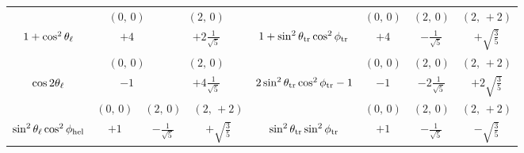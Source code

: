 \begin{table}[p]
\begin{tabular}{| c | c c c c c c || c | c c c c c c |}
                                     &  \multicolumn{3}{c|}{$(0,\,0)$}
                                     &  \multicolumn{3}{c||}{$(2,\,0)$}               &
                                     &  \multicolumn{2}{c|}{$(0,\,0)$}
                                     &  \multicolumn{2}{c|}{$(2,\,0)$}
                                     &  \multicolumn{2}{c|}{$(2,\,+2)$}               \\
    \cline{2-7}\cline{9-14}
    $1+\cos^2\theta_\ell$                &  \multicolumn{3}{c|}{$+4$}
                                     &  \multicolumn{3}{c||}{$+2\frac{1}{\sqrt{5}}$}  &
    $1+\sin^2\theta_\text{tr} \cos^2\phi_\text{tr}$  &  \multicolumn{2}{c|}{$+4$}
                                     &  \multicolumn{2}{c|}{$-\frac{1}{\sqrt{5}}$}
                                     &  \multicolumn{2}{c|}{$+\sqrt{\frac{3}{5}}$}    \\
    \hline

                                        &  \multicolumn{3}{c|}{$(0,\,0)$}
                                        &  \multicolumn{3}{c||}{$(2,\,0)$}           &
                                        &  \multicolumn{2}{c|}{$(0,\,0)$}
                                        &  \multicolumn{2}{c|}{$(2,\,0)$}
                                        &  \multicolumn{2}{c|}{$(2,\,+2)$}              \\
    \cline{2-7}\cline{9-14}
    $\cos2\theta_\ell$                      &  \multicolumn{3}{c|}{$-1$}
                                        &  \multicolumn{3}{c||}{$+4\frac{1}{\sqrt{5}}$}  &
    $2\sin^2\theta_\text{tr} \cos^2\phi_\text{tr} - 1$  &  \multicolumn{2}{c|}{$-1$}
                                        &  \multicolumn{2}{c|}{$-2\frac{1}{\sqrt{5}}$}
                                        &  \multicolumn{2}{c|}{$+2\sqrt{\frac{3}{5}}$}   \\
    \hline

                                   &  \multicolumn{2}{c|}{$(0,\,0)$}
                                   &  \multicolumn{2}{c|}{$(2,\,0)$}
                                   &  \multicolumn{2}{c||}{$(2,\,+2)$}            &
                                   &  \multicolumn{2}{c|}{$(0,\,0)$}
                                   &  \multicolumn{2}{c|}{$(2,\,0)$}
                                   &  \multicolumn{2}{c|}{$(2,\,+2)$}             \\
    \cline{2-7}\cline{9-14}
    $\sin^2\theta_\ell \cos^2\phi_\text{hel}$  &  \multicolumn{2}{c|}{$+1$}
                                   &  \multicolumn{2}{c|}{$-\frac{1}{\sqrt{5}}$}
                                   &  \multicolumn{2}{c||}{$+\sqrt{\frac{3}{5}}$}  &
    $\sin^2\theta_\text{tr} \sin^2\phi_\text{tr}$  &  \multicolumn{2}{c|}{$+1$}
                                   &  \multicolumn{2}{c|}{$-\frac{1}{\sqrt{5}}$}
                                   &  \multicolumn{2}{c|}{$-\sqrt{\frac{3}{5}}$}   \\
    \hline


\end{tabular}
\end{table}
